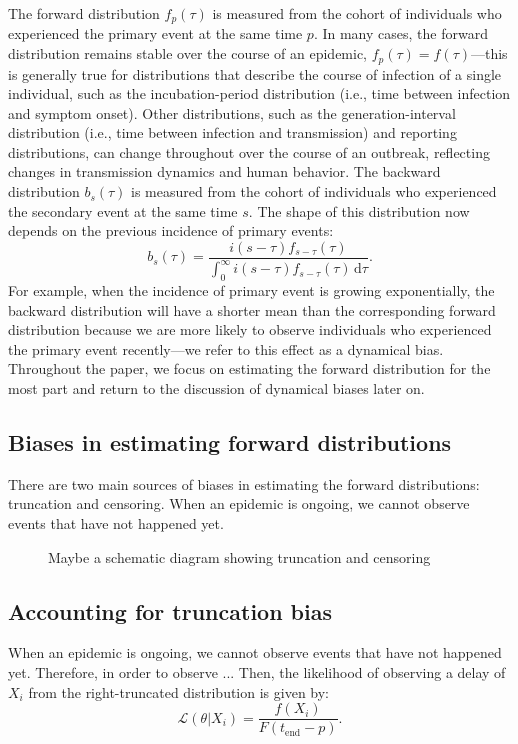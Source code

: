 \documentclass[12pt]{article}
\newcommand{\dd}[1]{\ensuremath{\, \mathrm{d}#1}}
\newcommand{\dtau}{\dd{\tau}}
\newcommand{\tend}{{t_{\mathrm{end}}}}
\begin{document}
The forward distribution $f_p(\tau)$ is measured from the cohort of individuals who experienced the primary event at the same time $p$.
In many cases, the forward distribution remains stable over the course of an epidemic, $f_p(\tau) = f(\tau)$---this is generally true for distributions that describe the course of infection of a single individual, such as the incubation-period distribution (i.e., time between infection and symptom onset).
Other distributions, such as the generation-interval distribution (i.e., time between infection and transmission) and reporting distributions, can change throughout over the course of an outbreak, reflecting changes in transmission dynamics and human behavior.
The backward distribution $b_s(\tau)$ is measured from the cohort of individuals who experienced the secondary event at the same time $s$.
The shape of this distribution now depends on the previous incidence of primary events: 
\begin{equation}
b_s(\tau) = \frac{i(s-\tau) f_{s-\tau}(\tau)}{\int_0^\infty i(s-\tau) f_{s-\tau}(\tau) \dtau}.
\end{equation}
For example, when the incidence of primary event is growing exponentially, the backward distribution will have a shorter mean than the corresponding forward distribution because we are more likely to observe individuals who experienced the primary event recently---we refer to this effect as a dynamical bias.
Throughout the paper, we focus on estimating the forward distribution for the most part and return to the discussion of dynamical biases later on.

\subsection{Biases in estimating forward distributions}

There are two main sources of biases in estimating the forward distributions: truncation and censoring.
When an epidemic is ongoing, we cannot observe events that have not happened yet.


\begin{figure}
\caption{Maybe a schematic diagram showing truncation and censoring}
\end{figure}

\subsection{Accounting for truncation bias}

When an epidemic is ongoing, we cannot observe events that have not happened yet.
Therefore, in order to observe ...
Then, the likelihood of observing a delay of $X_i$ from the right-truncated distribution is given by:
\begin{equation}
\mathcal L(\theta|X_i) = \frac{f(X_i)}{F(\tend-p)}.
\end{equation}
\end{document}
